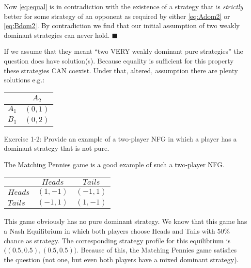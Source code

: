 \documentclass[../main.tex]{subfiles}
\begin{document}
\begin{solution}
	Now \autoref{eq:equal} is in contradiction with the existence of a strategy that is \emph{strictly} better for some strategy of an opponent as required by either \autoref{eq:Adom2} or \autoref{eq:Bdom2}.
	By contradiction we find that our initial assumption of two weakly dominant strategies can never hold. $\blacksquare$

	If we assume that they meant ``two VERY weakly dominant pure strategies'' the question does have solution(s). Because equality is sufficient for this property these strategies CAN coexist.
	Under that, altered, assumption there are plenty solutions e.g.: 
        \begin{center}
    	    \begin{tabular}{|l|c|}
    	    \hline
    	    & $A_2$ \\
    	    \hline
			$A_1$ & $(0,1)$\\
    	    \hline
    	    $B_1$ & $(0,2)$\\
    	    \hline
    	    \end{tabular}
        \end{center}

\end{solution}

\begin{question}
Exercise 1-2: Provide an example of a two-player NFG in which a player has a dominant strategy that is not pure.
\end{question}

\begin{solution}
The Matching Pennies game is a good example of such a two-player NFG.
        \begin{center}
    	    \begin{tabular}{|l|c|c|}
    	    \hline
    	    & $Heads$ & $Tails$ \\
    	    \hline
    	    $Heads$ & $(1,-1)$ & $(-1,1)$ \\
    	    \hline
    	    $Tails$ & $(-1,1)$ & $(1,-1)$ \\
    	    \hline
    	    \end{tabular}
        \end{center}
This game obviously has no pure dominant strategy.
We know that this game has a Nash Equilibrium in which both players choose Heads and Tails with 50\% chance as strategy.
The corresponding strategy profile for this equilibrium is $\big((0.5,0.5), (0.5,0.5)\big)$.
Because of this, the Matching Pennies game satisfies the question (not one, but even both players have a mixed dominant strategy).
\end{solution}
\end{document}
